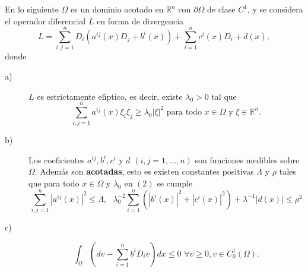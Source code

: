 


En lo siguiente $\Omega$ es un dominio acotado en $\mathbb{R}^{n}$ con
$\partial\Omega$ de clase $C^{1}$, y se considera el operador diferencial $L$
en forma de divergencia
\begin{equation}
L=\sum_{i,j=1}^{n}D_{i}\left(  a^{ij}\left(  x\right)  D_{j}+b^{i}\left(
x\right)  \right)  +\sum_{i=1}^{n}c^{i}\left(  x\right)  D_{i}+d\left(
x\right)  ,\tag{1}%
\end{equation}
donde

\begin{description}
\item [a)]$L$ es estrictamente el\'{\i}ptico, es decir, existe $\lambda_{0}>0$
tal que
\begin{equation}
\sum_{i,j=1}^{n}a^{ij}\left(  x\right)  \xi_{i}\xi_{j}\geq\lambda
_{0}\left\vert \xi\right\vert ^{2}\text{ para todo }x\in\Omega\text{ y }\xi
\in\mathbb{R}^{n}.\tag{2}%
\end{equation}

\item[b)] Los coeficientes $a^{ij},b^{i},c^{i}$ y $d$ $\left(
i,j=1,...,n\right)  $ son funciones medibles sobre $\Omega$. Adem\'{a}s son
\textbf{acotadas}, esto es existen constantes positivas $\Lambda$ y $\rho$
tales que para todo $x\in\Omega$ y $\lambda_{0}$ en $\left(  2\right)  $ se
cumple
\begin{equation}
\sum_{i,j=1}^{n}\left\vert a^{ij}\left(  x\right)  \right\vert ^{2}\leq
\Lambda,\text{ \ }\lambda_{0}^{-2}\sum_{i=1}^{n}\left(  \left\vert
b^{i}\left(  x\right)  \right\vert ^{2}+\left\vert c^{i}\left(  x\right)
\right\vert ^{2}\right)  +\lambda^{-1}\left\vert d\left(  x\right)
\right\vert \leq\rho^{2}\tag{3}%
\end{equation}

\item[c)]
\begin{equation}
\int_{\Omega}\left(  dv-\sum_{i=1}^{n}b^{i}D_{i}v\right)  dx\leq0\text{
\ }\forall v\geq0,v\in C_{0}^{1}\left(  \Omega\right)  .\tag{4}%
\end{equation}
\end{description}

